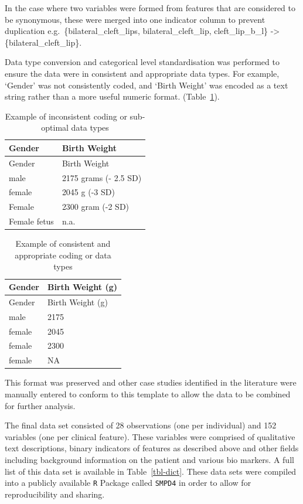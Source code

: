 \documentclass[
  authoryear,
  preprint,
  3p]{elsarticle}
\begin{document}
In the case where two variables were formed from features that are
considered to be synonymous, these were merged into one indicator column
to prevent duplication e.g.~\{bilateral\_cleft\_lips,
bilateral\_cleft\_lip, cleft\_lip\_b\_l\} -\textgreater{}
\{bilateral\_cleft\_lip\}.

Data type conversion and categorical level standardisation was performed
to ensure the data were in consistent and appropriate data types. For
example, `Gender' was not consistently coded, and `Birth Weight' was
encoded as a text string rather than a more useful numeric format.
(Table~\ref{tbl-data-types}).

\hypertarget{tbl-data-types}{}
\begin{longtable}[]{@{}ll@{}}
\caption{\label{tbl-data-types}Example of inconsistent coding or
sub-optimal data types}\tabularnewline
\toprule()
Gender & Birth Weight \\
\midrule()
\endfirsthead
\toprule()
Gender & Birth Weight \\
\midrule()
\endhead
male & 2175 grams (- 2.5 SD) \\
female & 2045 g (-3 SD) \\
Female & 2300 gram (-2 SD) \\
Female fetus & n.a. \\
\bottomrule()
\end{longtable}

\hypertarget{tbl-data-types2}{}
\begin{longtable}[]{@{}ll@{}}
\caption{\label{tbl-data-types2}Example of consistent and appropriate
coding or data types}\tabularnewline
\toprule()
Gender & Birth Weight (g) \\
\midrule()
\endfirsthead
\toprule()
Gender & Birth Weight (g) \\
\midrule()
\endhead
male & 2175 \\
female & 2045 \\
female & 2300 \\
female & NA \\
\bottomrule()
\end{longtable}

This format was preserved and other case studies identified in the
literature
\citep{ravenscroft2021neurogenetic, monies2019lessons, bijarnia2022growth, ji2022case}
were manually entered to conform to this template to allow the data to
be combined for further analysis.

The final data set consisted of 28 observations (one per individual) and
152 variables (one per clinical feature). These variables were comprised
of qualitative text descriptions, binary indicators of features as
described above and other fields including background information on the
patient and various bio markers. A full list of this data set is
available in Table~\ref{tbl-dict}. These data sets were compiled into a
publicly available \texttt{R} Package called \texttt{SMPD4}
\citep{smpd4-data} in order to allow for reproducibility and sharing.
\end{document}
